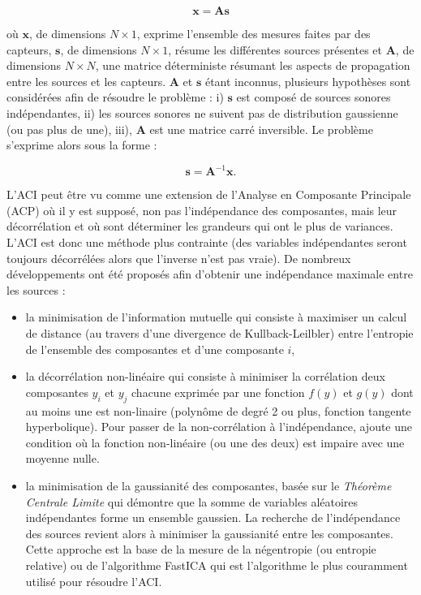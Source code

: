 \begin{equation}\label{eq:ACI2}
\mathbf{x} = \mathbf{As}
\end{equation}

où $\mathbf{x}$, de dimensions $N \times 1$, exprime l'ensemble des mesures faites par des capteurs, $\mathbf{s}$, de dimensions $N \times 1$, résume les différentes sources présentes et $\mathbf{A}$, de dimensions $N \times N$, une matrice déterministe résumant les aspects de propagation entre les sources et les capteurs.
$\mathbf{A}$ et $\mathbf{s}$ étant inconnus, plusieurs hypothèses sont considérées afin de résoudre le problème : i) $\mathbf{s}$ est composé de sources sonores indépendantes, ii) les sources sonores ne suivent pas de distribution gaussienne (ou pas plus de une), iii), $\mathbf{A}$ est une matrice carré inversible. Le problème s'exprime alors sous la forme :

\begin{equation}
\mathbf{s} = \mathbf{A}^{-1}\mathbf{x}.
\end{equation}

L'ACI peut être vu comme une extension de l'Analyse en Composante Principale (ACP) où il y est supposé, non pas l'indépendance des composantes, mais leur décorrélation et où sont déterminer les grandeurs qui ont le plus de variances. L'ACI est donc une méthode plus contrainte (des variables indépendantes seront toujours décorrélées alors que l'inverse n'est pas vraie).
De nombreux développements ont été proposés afin d'obtenir une indépendance maximale entre les sources :

\begin{itemize}
\item la minimisation de l'information mutuelle \cite{hyvarinen97independentcomponent} qui consiste à maximiser un calcul de distance (au travers d'une divergence de Kullback-Leilbler) entre l'entropie de l'ensemble des composantes et d'une composante $i$,
\item la décorrélation non-linéaire qui consiste à minimiser la corrélation deux composantes $y_i$ et $y_j$ chacune exprimée par une fonction $f(y)$ et $g(y)$ dont au moins une est non-linaire (polynôme de degré 2 ou plus, fonction tangente hyperbolique). Pour passer de la non-corrélation à l'indépendance, \cite{jutten1991blind} ajoute une condition où la fonction non-linéaire (ou une des deux)  est impaire avec une moyenne nulle.
\item la minimisation de la \og gaussianité \fg{} des composantes, basée sur le \textit{Théorème Centrale Limite} qui démontre que la somme de variables aléatoires indépendantes forme un ensemble gaussien. La recherche de l'indépendance des sources revient alors à minimiser la \og gaussianité \fg{} entre les composantes. Cette approche est la base de la mesure de la négentropie (ou entropie relative) \cite{lee2000unifying} ou de l'algorithme FastICA \cite{hyvarinen1999fast} qui est l'algorithme le plus couramment utilisé pour résoudre l'ACI.
\end{itemize}

